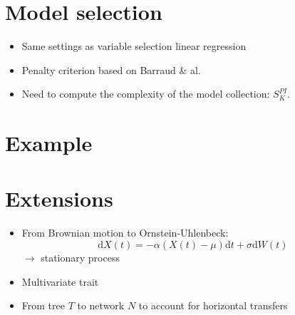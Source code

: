 \documentclass[12pt]{article}
\renewcommand{\d}{\text{d}}
\newcommand{\ra}{$\rightarrow$\xspace}
\begin{document}
{\section{Model selection}

\begin{itemize}
\item Same settings as variable selection linear regression
\item Penalty criterion based on Barraud \& al.
\item Need to compute the complexity of the model collection: $S_K^{PI}$.
\end{itemize}

\bigskip
\section{Example}

\bigskip
\section{Extensions}

\begin{itemize}
\item From Brownian motion to Ornstein-Uhlenbeck:
$$
\d X(t) = - \alpha (X(t) - \mu) \d t + \sigma \d W(t)
$$
\ra stationary process
\item Multivariate trait
\item From tree $T$ to network $N$ to account for horizontal transfers
\end{itemize}
}
\end{document}

